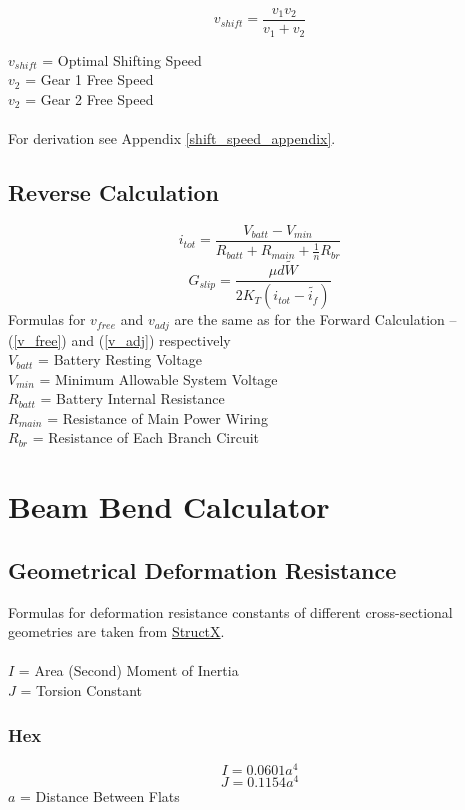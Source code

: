 \documentclass[11pt,a4paper,titlepage]{article}
\begin{document}
	\begin{equation} \label{v_shift}
		v_{shift} = \frac{v_1 v_2}{v_1 + v_2}
	\end{equation}
	
	$v_{shift}$ = Optimal Shifting Speed \\
	$v_2$ = Gear 1 Free Speed \\
	$v_2$ = Gear 2 Free Speed \\ \\
	For derivation see Appendix \ref{shift_speed_appendix}.
	
	\subsection{Reverse Calculation}
	\begin{equation}
		i_{tot} = \frac{V_{batt} - V_{min}}{R_{batt} + R_{main} + \frac{1}{n}R_{br}}
	\end{equation}
	\begin{equation}
		G_{slip} = \frac{\mu d \tilde{W}}{2 K_T \left( i_{tot} - \tilde{i_f} \right)}
	\end{equation}
	Formulas for $v_{free}$ and $v_{adj}$ are the same as for the Forward Calculation -- (\ref{v_free}) and (\ref{v_adj}) respectively\\
	
	$V_{batt}$ = Battery Resting Voltage \\
	$V_{min}$ = Minimum Allowable System Voltage \\
	$R_{batt}$ = Battery Internal Resistance \\
	$R_{main}$ = Resistance of Main Power Wiring \\
	$R_{br}$ = Resistance of Each Branch Circuit
	
	\bigskip
	\section{Beam Bend Calculator}
	\subsection{Geometrical Deformation Resistance}
	Formulas for deformation resistance constants of different cross-sectional geometries are taken from \href{https://structx.com/geometric_properties.html}{StructX}. \\ \\
	$I$ = Area (Second) Moment of Inertia \\
	$J$ = Torsion Constant
	\subsubsection{Hex}
	\begin{equation}
		I = 0.0601 a^4
	\end{equation}
	\begin{equation}
		J = 0.1154 a^4
	\end{equation}
	$a$ = Distance Between Flats
	
\end{document}
